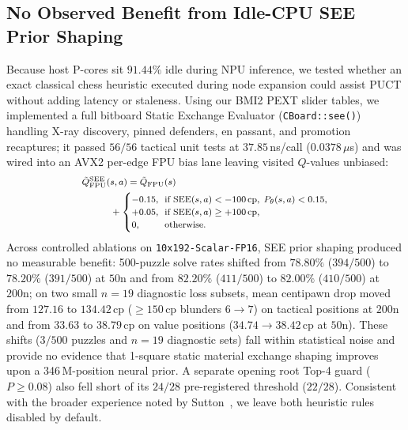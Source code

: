 \documentclass[10pt,twocolumn]{article}
\begin{document}
\subsection{No Observed Benefit from Idle-CPU SEE Prior Shaping}
\label{sec:see}
Because host P-cores sit $91.44\%$ idle during NPU inference, we tested whether an exact classical chess heuristic executed during node expansion could assist PUCT without adding latency or staleness. Using our BMI2 PEXT slider tables, we implemented a full bitboard Static Exchange Evaluator (\texttt{CBoard::see()}) handling X-ray discovery, pinned defenders, en passant, and promotion recaptures; it passed $56/56$ tactical unit tests at $37.85$\,ns/call ($0.0378\,\mu$s) and was wired into an AVX2 per-edge FPU bias lane leaving visited $Q$-values unbiased:
\begin{equation}
  {\footnotesize
  \begin{aligned}
    \tilde{Q}_{\mathrm{FPU}}^{\mathrm{SEE}}(s,a) &= \tilde{Q}_{\mathrm{FPU}}(s) \\
    &\hspace{-1.8em}+
    \begin{cases}
      -0.15, & \!\!\text{if }\mathrm{SEE}(s,a) < -100\,\text{cp},\; P_\theta(s,a) < 0.15, \\
      +0.05, & \!\!\text{if }\mathrm{SEE}(s,a) \ge +100\,\text{cp}, \\
      0,     & \!\!\text{otherwise.}
    \end{cases}
  \end{aligned}}
  \label{eq:see_fpu}
\end{equation}
Across controlled ablations on \texttt{10x192-Scalar-FP16}, SEE prior shaping produced no measurable benefit: 500-puzzle solve rates shifted from $78.80\%$ ($394/500$) to $78.20\%$ ($391/500$) at $50\text{n}$ and from $82.20\%$ ($411/500$) to $82.00\%$ ($410/500$) at $200\text{n}$; on two small $n=19$ diagnostic loss subsets, mean centipawn drop moved from $127.16$ to $134.42$\,cp ($\ge 150$\,cp blunders $6 \to 7$) on tactical positions at $200\text{n}$ and from $33.63$ to $38.79$\,cp on value positions ($34.74 \to 38.42$\,cp at $50\text{n}$). These shifts ($3/500$ puzzles and $n=19$ diagnostic sets) fall within statistical noise and provide no evidence that 1-square static material exchange shaping improves upon a 346\,M-position neural prior. A separate opening root Top-4 guard ($P \ge 0.08$) also fell short of its $24/28$ pre-registered threshold ($22/28$). Consistent with the broader experience noted by Sutton~\cite{sutton2019bitter}, we leave both heuristic rules disabled by default.
\end{document}
